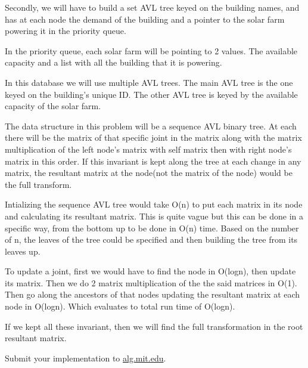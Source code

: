 \documentclass[12pt,twoside]{article}
\begin{document}
\begin{problems}
Secondly, we will have to build a set AVL tree keyed on the building names, and has at each node the demand of the building and a pointer to the solar farm powering it in the priority queue.

In the priority queue, each solar farm will be pointing to 2 values. The available capacity and a list with all the building that it is powering.

In this database we will use multiple AVL trees. The main AVL tree is the one keyed on the building's unique ID. The other AVL tree is keyed by the available capacity of the solar farm.




\newpage
\problem  %

The data structure in this problem will be a sequence AVL binary tree. At each there will be the matrix of that specific joint in the matrix along with the matrix multiplication of the left node's matrix with self matrix then with right node's matrix in this order. If this invariant is kept along the tree at each change in any matrix, the resultant matrix at the node(not the matrix of the node) would be the full transform.

Intializing the sequence AVL tree would take O(n) to put each matrix in its node and calculating its resultant matrix. This is quite vague but this can be done in a specific way, from the bottom up to be done in O(n) time. Based on the number of n, the leaves of the tree could be specified and then building the tree from its leaves up.

To update a joint, first we would have to find the node in O(logn), then update its matrix. Then we do 2 matrix multiplication of the the said matrices in O(1). Then go along the ancestors of that nodes updating the resultant matrix at each node in O(logn). Which evaluates to total run time of O(logn).

If we kept all these invariant, then we will find the full transformation in the root resultant matrix.


\newpage
\problem  %
\begin{problemparts}
\problempart %
\problempart %
\problempart %
\problempart Submit your implementation to {\small\url{alg.mit.edu}}.
\end{problemparts}

\end{problems}
\end{document}
